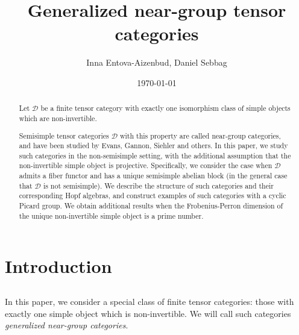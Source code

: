 \documentclass{amsart}
\title{Generalized near-group tensor categories}
\author{Inna Entova-Aizenbud, Daniel Sebbag}
\date{\today}
\theoremstyle{plain}%
\theoremstyle{remark}
\newcommand{\1}{\mathbbm{1}}
\newcommand{\D}{\mathcal{D}}
\begin{document}
\begin{abstract}
   Let $\D$ be a finite tensor category with exactly one isomorphism class of simple objects which are non-invertible. 
   
   Semisimple tensor categories $\D$ with this property are called near-group categories, and have been studied by Evans, Gannon, Siehler and others. In this paper, we study such categories in the non-semisimple setting, with the additional assumption that the non-invertible simple object is projective. Specifically, we consider the case when $\D$ admits a fiber functor and has a unique semisimple abelian block (in the general case that $\D$ is not semisimple). We describe the structure of such categories and their corresponding Hopf algebras, and construct examples of such categories with a cyclic Picard group. We obtain additional results when the Frobenius-Perron dimension of the unique non-invertible simple object is a prime number.
\end{abstract}

\maketitle

\section{Introduction}
\subsection{}
    In this paper, we consider a special class of finite tensor categories: those with exactly one simple object which is non-invertible. We will call such categories {\it generalized near-group categories}.
\end{document}
